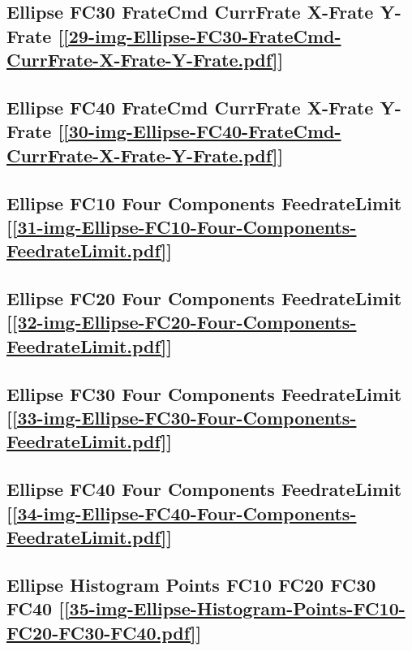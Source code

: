 \subsection       {Ellipse FC30 FrateCmd CurrFrate X-Frate Y-Frate
[\ref      {29-img-Ellipse-FC30-FrateCmd-CurrFrate-X-Frate-Y-Frate.pdf}] }
\label{ssec-29-img-Ellipse-FC30-FrateCmd-CurrFrate-X-Frate-Y-Frate.pdf}

\subsection       {Ellipse FC40 FrateCmd CurrFrate X-Frate Y-Frate
[\ref      {30-img-Ellipse-FC40-FrateCmd-CurrFrate-X-Frate-Y-Frate.pdf}] }
\label{ssec-30-img-Ellipse-FC40-FrateCmd-CurrFrate-X-Frate-Y-Frate.pdf}

\subsection       {Ellipse FC10 Four Components FeedrateLimit
[\ref      {31-img-Ellipse-FC10-Four-Components-FeedrateLimit.pdf}] }
\label{ssec-31-img-Ellipse-FC10-Four-Components-FeedrateLimit.pdf}

\subsection       {Ellipse FC20 Four Components FeedrateLimit
[\ref      {32-img-Ellipse-FC20-Four-Components-FeedrateLimit.pdf}] }
\label{ssec-32-img-Ellipse-FC20-Four-Components-FeedrateLimit.pdf}

\subsection       {Ellipse FC30 Four Components FeedrateLimit
[\ref      {33-img-Ellipse-FC30-Four-Components-FeedrateLimit.pdf}] }
\label{ssec-33-img-Ellipse-FC30-Four-Components-FeedrateLimit.pdf}

\subsection       {Ellipse FC40 Four Components FeedrateLimit
[\ref      {34-img-Ellipse-FC40-Four-Components-FeedrateLimit.pdf}]}
\label{ssec-34-img-Ellipse-FC40-Four-Components-FeedrateLimit.pdf}

\subsection       {Ellipse Histogram Points FC10 FC20 FC30 FC40
[\ref      {35-img-Ellipse-Histogram-Points-FC10-FC20-FC30-FC40.pdf}] }
\label{ssec-35-img-Ellipse-Histogram-Points-FC10-FC20-FC30-FC40.pdf}

